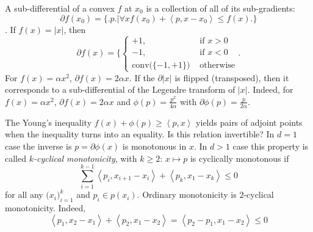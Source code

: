 \documentclass[a4paper]{article}
\newcommand{\brkt}[1]{{\left\langle #1 \right\rangle}}
\begin{document}
A sub-differential of a convex $f$ at $x_0$ is a collection of all of its sub-gradients:
\[\partial f(x_0) = \big\{\big. p \big.\big\rvert \forall x f(x_0) + \brkt{p,x-x_0} \leq f(x) \big.\big\}\].
If $f(x) = \lvert x\rvert$, then
\[\partial f(x) = \bigg\{\begin{cases}
	+1, &\text{ if } x>0\\
	-1, &\text{ if } x<0\\
	\text{conv}\big(\{-1,+1\}\big) &\text{ otherwise}
\end{cases}\bigg.\]
For $f(x) = \alpha x^2$, $\partial f(x) = 2\alpha x$.
If the $\partial \lvert x\rvert$ is flipped (transposed), then it corresponds to a sub-differential of the Legendre transform of $\lvert x\rvert$.
Indeed, for $f(x) = \alpha x^2$, $\partial f(x) = 2\alpha x$ and $\phi(p) = \frac{p^2}{4\alpha}$ with $\partial \phi(p) = \frac{p}{2\alpha}$.

The Young's inequality $f(x) + \phi(p) \geq \brkt{p,x}$ yields pairs of adjoint points when the inequality turns into an equality.
Is this relation invertible? In $d=1$ case the inverse is $p=\partial \phi(x)$ is monotonous in $x$.
In $d>1$ case this property is called \emph{$k$-cyclical monotonicity}, with $k\geq2$: $x\mapsto p$ is cyclically monotonous if
\[ \sum_{i=1}^{k-1} \brkt{p_i, x_{i+1}-x_i} + \brkt{p_k, x_1-x_k} \leq 0\]
for all any $\big(x_i\big)_{i=1}^k$ and $p_i \in p(x_i)$.
Ordinary monotonicity is $2$-cyclical monotonicity. Indeed, 
\[\brkt{p_1, x_2-x_1}+\brkt{p_2, x_1- x_2} = \brkt{p_2-p_1, x_1-x_2}\leq 0\]



\end{document}
